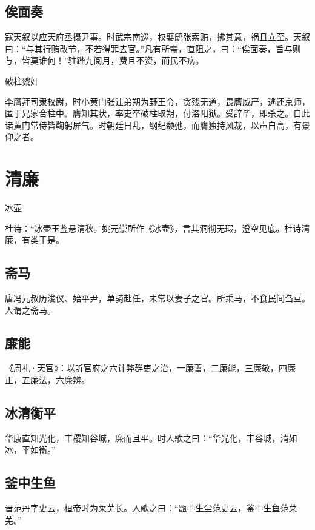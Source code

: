 \documentclass[a4paper,12pt,UTF8,twoside]{ctexbook}
\begin{document}
    \section{俟面奏}
    
    寇天叙以应天府丞摄尹事。时武宗南巡，权嬖鸱张索贿，拂其意，祸且立至。天叙曰：“与其行贿改节，不若得罪去官。”凡有所需，直阻之，曰：“俟面奏，旨与则与，皆莫谁何！”驻跸九阅月，费且不资，而民不病。
    
    破柱戮奸
    
    李膺拜司隶校尉，时小黄门张让弟朔为野王令，贪残无道，畏膺威严，逃还京师，匿于兄家合柱中。膺知其状，率吏卒破柱取朔，付洛阳狱。受辞毕，即杀之。自此诸黄门常侍皆鞠躬屏气。时朝廷日乱，纲纪颓弛，而膺独持风裁，以声自高，有景仰之者。
    
    \chapter{清廉}
    
    冰壶
    
    杜诗：“冰壶玉鉴悬清秋。”姚元崇所作《冰壶》，言其洞彻无瑕，澄空见底。杜诗清廉，有类于是。
    
    \section{斋马}
    
    唐冯元叔历浚仪、始平尹，单骑赴任，未常以妻子之官。所乘马，不食民间刍豆。人谓之斋马。
    
    \section{廉能}
    
    《周礼·天官》：以听官府之六计弊群吏之治，一廉善，二廉能，三廉敬，四廉正，五廉法，六廉辨。
    
    \section{冰清衡平}
    
    华康直知光化，丰稷知谷城，廉而且平。时人歌之曰：“华光化，丰谷城，清如冰，平如衡。”
    
    \section{釜中生鱼}
    
    晋范丹字史云，桓帝时为莱芜长。人歌之曰：“甑中生尘范史云，釜中生鱼范莱芜。”
    
\end{document}

